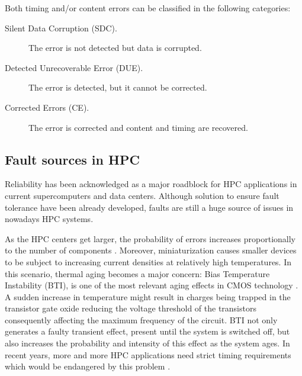 Both timing and/or content errors can be classified in the following categories:
\begin{description}
    \item [Silent Data Corruption (SDC).] The error is not detected but data is corrupted.
    \item [Detected Unrecoverable Error (DUE).] The error is detected, but it cannot be corrected.
    \item [Corrected Errors (CE).] The error is corrected and content and timing are recovered.
\end{description}

\subsection{Fault sources in HPC}
Reliability has been acknowledged as a major roadblock for HPC applications in current supercomputers and data centers. Although solution to ensure fault tolerance have been already developed, faults are still a huge source of issues in nowadays HPC systems.

As the HPC centers get larger, the probability of errors increases proportionally to the number of components \cite{10.1145/3403956}. Moreover, miniaturization causes smaller devices to be subject to increasing current densities at relatively high temperatures. In this scenario, thermal aging becomes a major concern: Bias Temperature Instability (BTI), is one of the most relevant aging effects in CMOS technology \cite{10.1145/3403956}. A sudden increase in temperature might result in charges being trapped in the transistor gate oxide reducing the voltage threshold of the transistors consequently affecting the maximum frequency of the circuit. BTI not only generates a faulty transient effect, present until the system is switched off, but also increases the probability and intensity of this effect as the system ages. In recent years, more and more HPC applications need strict timing requirements which would be endangered by this problem \cite{reghenzani2020timing}.

